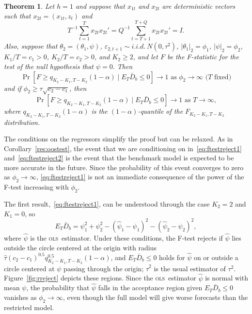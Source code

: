 \documentclass[11pt]{article}
\newtheorem{thm}{Theorem}[section]
\newcommand{\oosB}{\bar{D}_b}
\newcommand{\h}{h}
\newcommand{\ols}{\textsc{ols}}
\begin{document}
\begin{thm}\label{res:ftest}
  Let $\h = 1$ and suppose that $x_{1t}$ and $x_{2t}$ are
  deterministic vectors such that $x_{2t} = (x_{1t}, z_t)$ and
\[
T^{-1} \sum_{t=1}^T x_{2t} x_{2t}'  = Q^{-1} \sum_{t=T+1}^{T+Q} x_{2t} x_{2t}' =
I.
\]
Also, suppose that $\theta_2 = (\theta_1, \psi)$, 
$\varepsilon_{2,t+1} \sim i.i.d.\ N(0,\tau^2)$,
$|\theta_1|_2 = \phi_1$, $|\psi|_2 = \phi_2$, $K_1/T = c_1 > 0$,
$K_2/T = c_2 > 0$, and $K_2 \geq 2$, and let $F$ be the F-statistic
for the test of the null hypothesis that $\psi = 0.$
Then 
\begin{equation}\label{eq:ftestreject1}
  \Pr[F \geq q_{K_2 - K_1, T - K_2}(1-\alpha) \mid E_T \oosB \leq 0
  ] \to 1\mbox{ as $\phi_2 \to \infty$ ($T$ fixed)}
\end{equation}
and if $\phi_2 \geq \tau \sqrt{c_2 - c_1}$, then
\begin{equation}\label{eq:ftestreject2}
  \Pr[F \geq q_{K_2 - K_1, T - K_2}(1-\alpha) \mid E_T \oosB \leq 0
  ] \to 1 \text{ as $T \to \infty$},
\end{equation}
where $q_{K_2-K_1, T-K_2}(1-\alpha)$ is the
$(1-\alpha)$-quantile of the $F_{K_2-K_1, T-K_2}$ distribution.
\end{thm}
The conditions on the regressors simplify the proof but can be
relaxed.  As in Corollary~\ref{res:oostest}, the event that we are
conditioning on in~\eqref{eq:ftestreject1} and~\eqref{eq:ftestreject2}
is the event that the benchmark model is expected to be more accurate
in the future.  Since the probability of this event converges to zero
as $\phi_2 \to \infty$, \eqref{eq:ftestreject1} is not an immediate
consequence of the power of the F-test increasing with $\phi_2$.

The first result,~\eqref{eq:ftestreject1}, can be understood through the case $K_2 = 2$ and
$K_1 = 0$, so
\begin{equation*}
  E_T \oosB = \psi_1^2 + \psi_2^2 - (\hat{\psi}_1 - \psi_1)^2 - (\hat\psi_2 - \psi_2)^2,
\end{equation*}
where $\hat{\psi}$ is the \ols\ estimator.  Under these conditions,
the F-test rejects if $\hat{\psi}$ lies outside the circle centered at
the origin with radius $\hat{\tau} (c_2 - c_1)^{0.5} q_{K_2-K_1,
  T-K_2}^{0.5}(1-\alpha)$, and $E_T \oosB \leq 0$ holds for $\hat\psi$
on or outside a circle centered at $\psi$ passing through the origin;
$\hat{\tau}^2$ is the usual estimator of $\tau^2$.
Figure~\ref{fig:rreject} depicts these regions.  Since the \ols\
estimator $\hat\psi$ is normal with mean $\psi$, the probability that
$\hat{\psi}$ falls in the acceptance region given $E_T \oosB \leq 0$
vanishes as $\phi_2 \to \infty$, even though the full model will give
worse forecasts than the restricted model.
\end{document}
